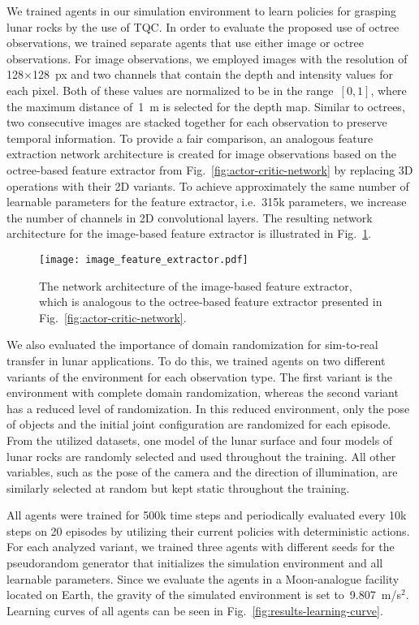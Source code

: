 We trained agents in our simulation environment to learn policies for grasping lunar rocks by the use of TQC. In order to evaluate the proposed use of octree observations, we trained separate agents that use either image or octree observations. For image observations, we employed images with the resolution of 128\(\times\)128~px and two channels that contain the depth and intensity values for each pixel. Both of these values are normalized to be in the range~\([0,1]\), where the maximum distance of~1~m is selected for the depth map. Similar to octrees, two consecutive images are stacked together for each observation to preserve temporal information. To provide a fair comparison, an analogous feature extraction network architecture is created for image observations based on the octree-based feature extractor from Fig.~\ref{fig:actor-critic-network} by replacing 3D operations with their 2D variants. To achieve approximately the same number of learnable parameters for the feature extractor, i.e.~315k parameters, we increase the number of channels in 2D convolutional layers. The resulting network architecture for the image-based feature extractor is illustrated in Fig.~\ref{fig:image-feature-extractor}.

\begin{figure}[ht]
	\centering
	\texttt{[image: image\_feature\_extractor.pdf]}
	\caption{The network architecture of the image-based feature extractor, which is analogous to the octree-based feature extractor presented in Fig.~\ref{fig:actor-critic-network}.}
	\label{fig:image-feature-extractor}
\end{figure}

We also evaluated the importance of domain randomization for sim-to-real transfer in lunar applications. To do this, we trained agents on two different variants of the environment for each observation type. The first variant is the environment with complete domain randomization, whereas the second variant has a reduced level of randomization. In this reduced environment, only the pose of objects and the initial joint configuration are randomized for each episode. From the utilized datasets, one model of the lunar surface and four models of lunar rocks are randomly selected and used throughout the training. All other variables, such as the pose of the camera and the direction of illumination, are similarly selected at random but kept static throughout the training.

All agents were trained for 500k time steps and periodically evaluated every 10k steps on 20 episodes by utilizing their current policies with deterministic actions. For each analyzed variant, we trained three agents with different seeds for the pseudorandom generator that initializes the simulation environment and all learnable parameters. Since we evaluate the agents in a Moon-analogue facility located on Earth, the gravity of the simulated environment is set to~9.807~m/s\(^2\). Learning curves of all agents can be seen in Fig.~\ref{fig:results-learning-curve}.

